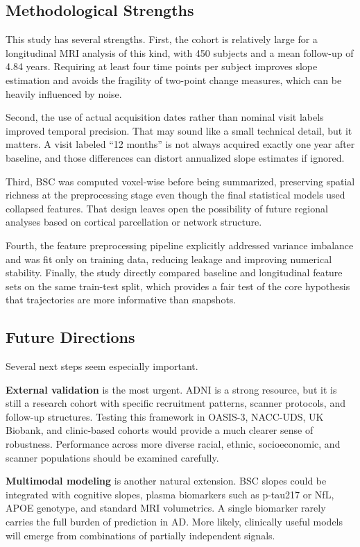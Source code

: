 \documentclass[blue]{ludusofficial}
\begin{document}
\subsection{Methodological Strengths}

This study has several strengths. First, the cohort is relatively large for a longitudinal MRI analysis of this kind, with 450 subjects and a mean follow-up of 4.84 years. Requiring at least four time points per subject improves slope estimation and avoids the fragility of two-point change measures, which can be heavily influenced by noise.

Second, the use of actual acquisition dates rather than nominal visit labels improved temporal precision. That may sound like a small technical detail, but it matters. A visit labeled ``12 months'' is not always acquired exactly one year after baseline, and those differences can distort annualized slope estimates if ignored.

Third, BSC was computed voxel-wise before being summarized, preserving spatial richness at the preprocessing stage even though the final statistical models used collapsed features. That design leaves open the possibility of future regional analyses based on cortical parcellation or network structure.

Fourth, the feature preprocessing pipeline explicitly addressed variance imbalance and was fit only on training data, reducing leakage and improving numerical stability. Finally, the study directly compared baseline and longitudinal feature sets on the same train-test split, which provides a fair test of the core hypothesis that trajectories are more informative than snapshots.

\subsection{Future Directions}

Several next steps seem especially important.

\textbf{External validation} is the most urgent. ADNI is a strong resource, but it is still a research cohort with specific recruitment patterns, scanner protocols, and follow-up structures. Testing this framework in OASIS-3, NACC-UDS, UK Biobank, and clinic-based cohorts would provide a much clearer sense of robustness. Performance across more diverse racial, ethnic, socioeconomic, and scanner populations should be examined carefully.

\textbf{Multimodal modeling} is another natural extension. BSC slopes could be integrated with cognitive slopes, plasma biomarkers such as p-tau217 or NfL, APOE genotype, and standard MRI volumetrics. A single biomarker rarely carries the full burden of prediction in AD. More likely, clinically useful models will emerge from combinations of partially independent signals.
\end{document}
